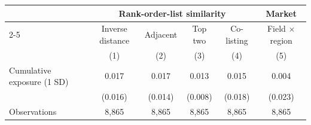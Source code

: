 \begin{tabular}{l*{5}{c}}
\toprule
 & \multicolumn{4}{c}{Rank-order-list similarity} & Market \\
\cmidrule(lr){2-5}
 & Inverse distance & Adjacent & Top two & Co-listing & Field \(\times\) region \\
 & (1) & (2) & (3) & (4) & (5) \\
\midrule
Cumulative exposure (1 SD)&       0.017         &       0.017         &       0.013\sym{*}  &       0.015         &       0.004         \\
            &     (0.016)         &     (0.014)         &     (0.008)         &     (0.018)         &     (0.023)         \\
\midrule
Observations&       8,865         &       8,865         &       8,865         &       8,865         &       8,865         \\
\bottomrule
\end{tabular}
